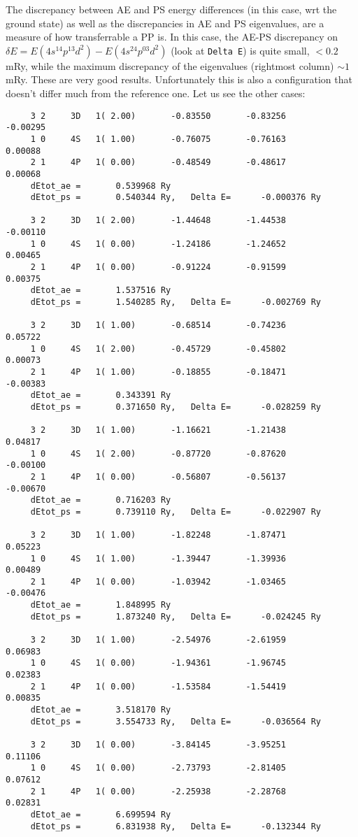 \documentclass[12pt,a4paper]{article}
\begin{document}
The discrepancy between AE and PS energy differences (in this case,
wrt the ground state) as well as the discrepancies in AE and PS 
eigenvalues, are a measure of how transferrable a PP is. In this case,
the AE-PS discrepancy on $\delta E = E(4s^14p^13d^2) - E(4s^24p^03d^2)$
(look at \texttt{Delta E}) is quite small, $<0.2$ mRy, while the 
maximum discrepancy of the eigenvalues (rightmost column) $\sim 1$ mRy. 
These are very good results.
Unfortunately this is also a configuration that doesn't differ much
from the reference one. Let us see the other cases:
\begin{verbatim}
     3 2     3D   1( 2.00)       -0.83550       -0.83256       -0.00295
     1 0     4S   1( 1.00)       -0.76075       -0.76163        0.00088
     2 1     4P   1( 0.00)       -0.48549       -0.48617        0.00068
     dEtot_ae =       0.539968 Ry
     dEtot_ps =       0.540344 Ry,   Delta E=      -0.000376 Ry
 
     3 2     3D   1( 2.00)       -1.44648       -1.44538       -0.00110
     1 0     4S   1( 0.00)       -1.24186       -1.24652        0.00465
     2 1     4P   1( 0.00)       -0.91224       -0.91599        0.00375
     dEtot_ae =       1.537516 Ry
     dEtot_ps =       1.540285 Ry,   Delta E=      -0.002769 Ry
 
     3 2     3D   1( 1.00)       -0.68514       -0.74236        0.05722
     1 0     4S   1( 2.00)       -0.45729       -0.45802        0.00073
     2 1     4P   1( 1.00)       -0.18855       -0.18471       -0.00383
     dEtot_ae =       0.343391 Ry
     dEtot_ps =       0.371650 Ry,   Delta E=      -0.028259 Ry
 
     3 2     3D   1( 1.00)       -1.16621       -1.21438        0.04817
     1 0     4S   1( 2.00)       -0.87720       -0.87620       -0.00100
     2 1     4P   1( 0.00)       -0.56807       -0.56137       -0.00670
     dEtot_ae =       0.716203 Ry
     dEtot_ps =       0.739110 Ry,   Delta E=      -0.022907 Ry
 
     3 2     3D   1( 1.00)       -1.82248       -1.87471        0.05223
     1 0     4S   1( 1.00)       -1.39447       -1.39936        0.00489
     2 1     4P   1( 0.00)       -1.03942       -1.03465       -0.00476
     dEtot_ae =       1.848995 Ry
     dEtot_ps =       1.873240 Ry,   Delta E=      -0.024245 Ry
 
     3 2     3D   1( 1.00)       -2.54976       -2.61959        0.06983
     1 0     4S   1( 0.00)       -1.94361       -1.96745        0.02383
     2 1     4P   1( 0.00)       -1.53584       -1.54419        0.00835
     dEtot_ae =       3.518170 Ry
     dEtot_ps =       3.554733 Ry,   Delta E=      -0.036564 Ry
 
     3 2     3D   1( 0.00)       -3.84145       -3.95251        0.11106
     1 0     4S   1( 0.00)       -2.73793       -2.81405        0.07612
     2 1     4P   1( 0.00)       -2.25938       -2.28768        0.02831
     dEtot_ae =       6.699594 Ry
     dEtot_ps =       6.831938 Ry,   Delta E=      -0.132344 Ry
\end{verbatim} 
\end{document}
